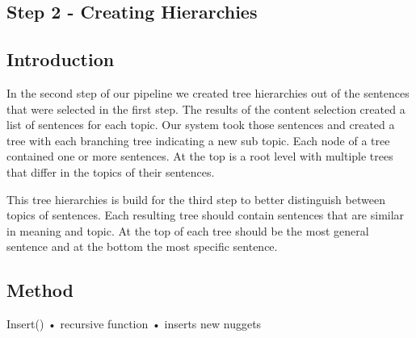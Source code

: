 




\subsection{Step 2 - Creating Hierarchies}

\subsection{Introduction}

In the second step of our pipeline we created tree hierarchies out of the sentences that were selected in the first step. The results of the content selection created a list of sentences for each topic. Our system took those sentences and created a tree with each branching tree indicating a new sub topic. Each node of a tree contained one or more sentences. At the top is a root level with multiple trees that differ in the topics of their sentences. 

This tree hierarchies is build for the third step to better distinguish between topics of sentences. Each resulting tree should contain sentences that are similar in meaning and topic. At the top of each tree should be the most general sentence and at the bottom the most specific sentence.


\subsection{Method}

Insert()
• recursive function
• inserts new nuggets

